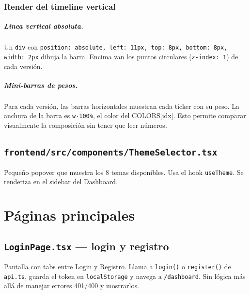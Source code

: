 \documentclass[11pt,a4paper]{book}
\begin{document}
\subsection{Render del timeline vertical}

\paragraph{Línea vertical absoluta.} Un \texttt{div} con \texttt{position: absolute, left: 11px, top: 8px, bottom: 8px, width: 2px} dibuja la barra. Encima van los puntos circulares (\texttt{z-index: 1}) de cada versión.

\paragraph{Mini-barras de pesos.} Para cada versión, las barras horizontales muestran cada ticker con su peso. La anchura de la barra es \texttt{w·100\%}, el color del COLORS[idx]. Esto permite comparar visualmente la composición sin tener que leer números.

\section{\texttt{frontend/src/components/ThemeSelector.tsx}}

Pequeño popover que muestra los 8 temas disponibles. Usa el hook \texttt{useTheme}. Se renderiza en el sidebar del Dashboard.

\chapter{Páginas principales}

\section{\texttt{LoginPage.tsx} --- login y registro}

Pantalla con tabs entre Login y Registro. Llama a \texttt{login()} o \texttt{register()} de \texttt{api.ts}, guarda el token en \texttt{localStorage} y navega a \texttt{/dashboard}. Sin lógica más allá de manejar errores 401/400 y mostrarlos.
\end{document}
